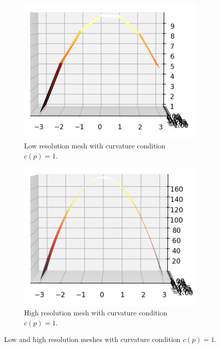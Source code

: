 \begin{figure}[H]
	\centering
	\begin{subfigure}[b]{0.49\linewidth}
		\centering
		\includegraphics[width=\linewidth]{Materials/lowresc1}
		\caption{Low resolution mesh with curvature condition $c(p) = 1$.}
		\label{lowresc1}
	\end{subfigure}
	\hfill
	\begin{subfigure}[b]{0.49\linewidth}
		\centering
		\includegraphics[width=\linewidth]{Materials/highresc1}
		\caption{High resolution mesh with curvature condition $c(p) = 1$.}
		\label{highresc1}
	\end{subfigure}
	\caption{Low and high resolution meshes with curvature condition $c(p) = 1$.}
	\label{c1meshes}
\end{figure}
